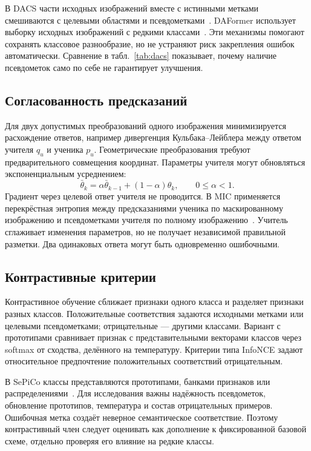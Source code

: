 В DACS части исходных изображений вместе с истинными метками смешиваются с целевыми областями и псевдометками~\cite{dacs}. DAFormer использует выборку исходных изображений с редкими классами~\cite{daformer}. Эти механизмы помогают сохранять классовое разнообразие, но не устраняют риск закрепления ошибок автоматически. Сравнение в табл.~\ref{tab:dacs} показывает, почему наличие псевдометок само по себе не гарантирует улучшения.

\subsection{Согласованность предсказаний}
Для двух допустимых преобразований одного изображения минимизируется расхождение ответов, например дивергенция Кульбака--Лейблера между ответом учителя $q_u$ и ученика $p_u$. Геометрические преобразования требуют предварительного совмещения координат. Параметры учителя могут обновляться экспоненциальным усреднением:
\begin{equation}
 \bar\theta_k=\alpha\bar\theta_{k-1}+(1-\alpha)\theta_k,\qquad 0\leq\alpha<1.
\end{equation}
Градиент через целевой ответ учителя не проводится. В MIC применяется перекрёстная энтропия между предсказаниями ученика по маскированному изображению и псевдометками учителя по полному изображению~\cite{mic}. Учитель сглаживает изменения параметров, но не получает независимой правильной разметки. Два одинаковых ответа могут быть одновременно ошибочными.

\subsection{Контрастивные критерии}
Контрастивное обучение сближает признаки одного класса и разделяет признаки разных классов. Положительные соответствия задаются исходными метками или целевыми псевдометками; отрицательные --- другими классами. Вариант с прототипами сравнивает признак с представительными векторами классов через softmax от сходства, делённого на температуру. Критерии типа InfoNCE задают относительное предпочтение положительных соответствий отрицательным.

В SePiCo классы представляются прототипами, банками признаков или распределениями~\cite{sepico}. Для исследования важны надёжность псевдометок, обновление прототипов, температура и состав отрицательных примеров. Ошибочная метка создаёт неверное семантическое соответствие. Поэтому контрастивный член следует оценивать как дополнение к фиксированной базовой схеме, отдельно проверяя его влияние на редкие классы.

